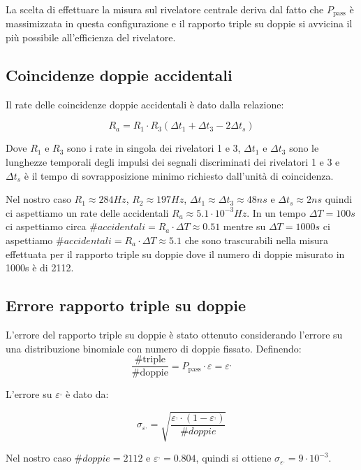 \documentclass[10pt,a4paper]{article}
\begin{document}
La scelta di effettuare la misura sul rivelatore centrale deriva dal fatto che $P_{\text{pass}}$ è massimizzata in questa configurazione e il rapporto triple su doppie si avvicina il più possibile all'efficienza del rivelatore.

\subsection{Coincidenze doppie accidentali}
\label{app2}

Il rate delle coincidenze doppie accidentali è dato dalla relazione:

$$R_a = R_1 \cdot R_3(\Delta t_1 + \Delta t_3 - 2\Delta t_s)$$

Dove $R_1$ e $R_3$ sono i rate in singola dei rivelatori 1 e 3, $\Delta t_1$ e $\Delta t_3$ sono le lunghezze temporali degli impulsi dei segnali discriminati dei rivelatori 1 e 3 e $\Delta t_s$ è il tempo di sovrapposizione minimo richiesto dall’unità di coincidenza.

Nel nostro caso $R_1 \approx 284 Hz$, $R_2 \approx 197 Hz$, $\Delta t_1 \approx \Delta t_3 \approx 48ns$ e $\Delta t_s \approx 2ns$ quindi ci aspettiamo un rate delle accidentali $R_a \approx 5.1\cdot 10^{-3} Hz$.
In un tempo $\Delta T = 100 s$ ci aspettiamo circa $\#accidentali = R_a \cdot \Delta T \approx 0.51$  mentre su $\Delta T = 1000 s$ ci aspettiamo $\#accidentali = R_a \cdot \Delta T \approx 5.1$ che sono trascurabili nella misura effettuata per il rapporto triple su doppie dove il numero di doppie misurato in 1000s è di 2112.

\subsection{Errore rapporto triple su doppie}
\label{app3}

L'errore del rapporto triple su doppie è stato ottenuto considerando l'errore su una distribuzione binomiale con numero di doppie fissato.
Definendo:
$$\frac{\#\text{triple}}{\#\text{doppie}}  = P_{\text{pass}} \cdot \varepsilon = {\varepsilon}^{,} $$

L'errore su ${\varepsilon}^{,} $ è dato da:

$$\sigma_{{\varepsilon}^{,}} = \sqrt {\frac{{\varepsilon}^{,} \cdot (1- {\varepsilon}^{,})}{\#doppie} }$$

Nel nostro caso $\#doppie = 2112$ e $\varepsilon^{,} = 0.804$, quindi si ottiene $\sigma_{{\varepsilon}^{,}} = 9 \cdot 10^{-3}$.
\end{document}
